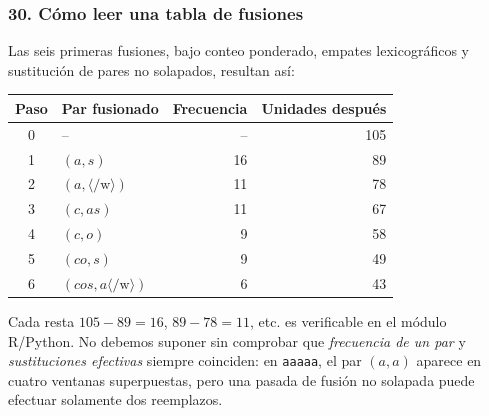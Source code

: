 \subsubsection*{30. Cómo leer una tabla de fusiones}
Las seis primeras fusiones, bajo conteo ponderado, empates lexicográficos y sustitución de pares no solapados, resultan así:
\begin{center}
\begin{tabular}{c l r r}\toprule
Paso & Par fusionado & Frecuencia & Unidades después\\\midrule
0 & -- & -- &105\\
1 & $(a,s)$ &16&89\\
2 & $(a,\langle/\mathrm{w}\rangle)$ &11&78\\
3 & $(c,as)$ &11&67\\
4 & $(c,o)$ &9&58\\
5 & $(co,s)$ &9&49\\
6 & $(cos,a\langle/\mathrm{w}\rangle)$ &6&43\\\bottomrule
\end{tabular}
\end{center}
\noindent Cada resta $105-89=16$, $89-78=11$, etc. es verificable en el módulo R/Python. No debemos suponer sin comprobar que \emph{frecuencia de un par} y \emph{sustituciones efectivas} siempre coinciden: en \texttt{aaaaa}, el par $(a,a)$ aparece en cuatro ventanas superpuestas, pero una pasada de fusión no solapada puede efectuar solamente dos reemplazos.

